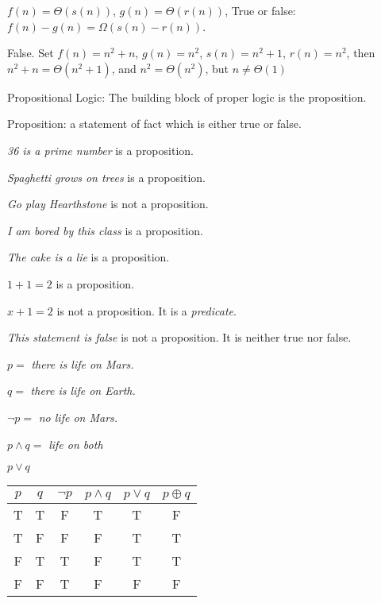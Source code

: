 \begin{prob}

$f(n) = \Theta(s(n))$, $g(n) = \Theta(r(n))$, True or false: $f(n) - g(n) = \Omega(s(n) - r(n))$.

False. Set $f(n) = n^2 + n$, $g(n) = n^2$, $s(n) = n^2 + 1$, $r(n) = n^2$, then $n^2 + n = \Theta(n^2 + 1)$, and $n^2 = \Theta(n^2)$, but $n \neq \Theta(1)$

\end{prob}

Propositional Logic: The building block of proper logic is the proposition.

\begin{defn}

Proposition: a statement of fact which is either true or false.

\end{defn}

\begin{ex}

\textit{36 is a prime number} is a proposition.

\textit{Spaghetti grows on trees} is a proposition.

\textit{Go play Hearthstone} is not a proposition.

\textit{I am bored by this class} is a proposition.

\textit{The cake is a lie} is a proposition.

$1 + 1 = 2$ is a proposition.

$x + 1 = 2$ is not a proposition. It is a \textit{predicate}.

\textit{This statement is false} is not a proposition. It is neither true nor false.

\end{ex}

\begin{ex}

$p =$ \textit{there is life on Mars.}

$q =$ \textit{there is life on Earth.}

$\lnot p =$ \textit{no life on Mars.}

$p \land q =$ \textit{life on both}

$p \lor q$

\begin{tabular}{cccccc}
$p$ & $q$ & $\lnot p$ & $p \land q$ & $p \lor q$ & $p \oplus q$\\\hline
  T &   T &         F &           T &          T &           F \\
  T &   F &         F &           F &          T &           T \\
  F &   T &         T &           F &          T &           T \\
  F &   F &         T &           F &          F &           F
\end{tabular}

\end{ex}

